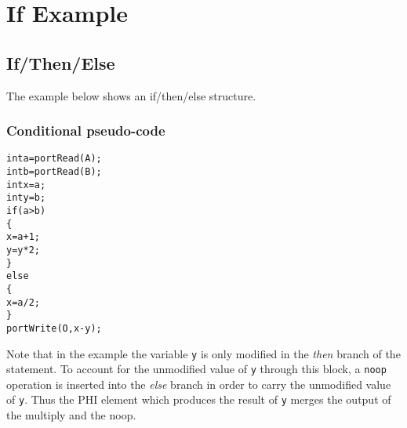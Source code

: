 \chapter{If Example}
\section{If/Then/Else}
The example below shows an if/then/else structure.
\subsection{Conditional pseudo-code}
\begin{alltt}
int a = portRead(A);
int b = portRead(B);
int x = a;
int y = b;
if (a > b) 
\{
  x = a + 1;
  y = y * 2;
\}
else
\{
  x = a / 2;
\}
portWrite(O, x - y);
\end{alltt}
Note that in the example the variable {\tt y} is only modified in the {\it then} branch of the statement.  To account for the unmodified value of {\tt y} through this block, a {\tt noop} operation is inserted into the {\it else} branch in order to carry the unmodified value of {\tt y}.  Thus the PHI element which produces the result of {\tt y} merges the output of the multiply and the noop.

